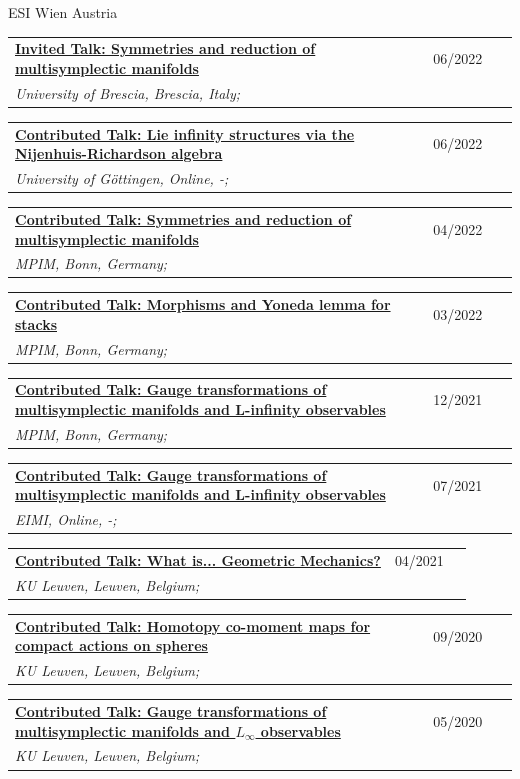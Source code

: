 \documentclass[a4paper]{article}
\newcommand{\longvoice}[8]{
    \begin{tabular}{p{0.83\linewidth} p{0.17\linewidth} }
        \textbf{\href{#3}{#2: #1}} & #4 
        \\ 
        \textit{#5, #6, #7;} & {\small\emph{#8}}
    \end{tabular}
    \vspace{.5em}
}
\begin{document}
        {ESI}
        {Wien}
        {Austria}
        {}
    \longvoice{Symmetries and reduction of multisymplectic manifolds}
        {Invited Talk}
        {https://www.dropbox.com/s/2elzcczx7m0o9zf/2206-Brescia-YoungPeople4Math.pdf?dl=0}
        {06/2022}
        {University of Brescia}
        {Brescia}
        {Italy}
        {}
    \longvoice{Lie infinity structures via the Nijenhuis-Richardson algebra}
        {Contributed Talk}
        {https://www.dropbox.com/s/lq862vynwme0eyn/2206-Online-GoodMorningSfars.pdf?dl=0}
        {06/2022}
        {University of Göttingen}
        {Online}
        {-}
        {}
    \longvoice{Symmetries and reduction of multisymplectic manifolds}
        {Contributed Talk}
        {https://www.mpim-bonn.mpg.de/node/11285}
        {04/2022}
        {MPIM}
        {Bonn}
        {Germany}
        {}
    \longvoice{Morphisms and Yoneda lemma for stacks}
        {Contributed Talk}
        {https://www.dropbox.com/s/rfu7cw1plq0wpzb/2203-Bonn-StackMorphisms.pdf?dl=0}
        {03/2022}
        {MPIM}
        {Bonn}
        {Germany}
        {}
    \longvoice{Gauge transformations of multisymplectic manifolds and L-infinity observables}
        {Contributed Talk}
        {https://www.dropbox.com/s/x267gvrge9xghq1/2112-Bonn-HigherSeminar.pdf?dl=0}
        {12/2021}
        {MPIM}
        {Bonn}
        {Germany}
        {}
    \longvoice{Gauge transformations of multisymplectic manifolds and L-infinity observables}
        {Contributed Talk}
        {https://www.researchgate.net/publication/353463068_Gauge_transformations_of_multisymplectic_manifolds_and_L_observables}
        {07/2021}
        {EIMI}
        {Online}
        {-}
        {}
    \longvoice{What is... Geometric Mechanics?}
        {Contributed Talk}
        {https://wis.kuleuven.be/agenda/PhdColloquia/ay20-21/copy4_of_PhD-coll-Molag}
        {04/2021}
        {KU Leuven}
        {Leuven}
        {Belgium}
        {}
    \longvoice{Homotopy co-moment maps for compact actions on spheres}
        {Contributed Talk}
        {https://www.researchgate.net/publication/344220375_Homotopy_co-moment_maps_for_compact_actions_on_spheres}
        {09/2020}
        {KU Leuven}
        {Leuven}
        {Belgium}
        {}
    \longvoice{Gauge transformations of multisymplectic manifolds and $L_\infty$ observables}
        {Contributed Talk}
        {https://www.researchgate.net/publication/344044689_Gauge_transformations_of_multisymplectic_manifolds_and_L_infinity_observables}
        {05/2020}
        {KU Leuven}
        {Leuven}
        {Belgium}
        {}
\end{document}
